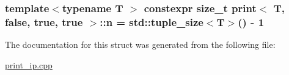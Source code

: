 \subsubsection[{\texorpdfstring{n}{n}}]{\setlength{\rightskip}{0pt plus 5cm}template$<$typename T $>$ constexpr size\+\_\+t {\bf print}$<$ T, false, true, true $>$\+::n = std\+::tuple\+\_\+size$<$T$>$() -\/ 1\hspace{0.3cm}{\ttfamily [static]}}\hypertarget{structprint_3_01T_00_01false_00_01true_00_01true_01_4_a2206343ff3fdd5212f3984384d1d59dc}{}\label{structprint_3_01T_00_01false_00_01true_00_01true_01_4_a2206343ff3fdd5212f3984384d1d59dc}


The documentation for this struct was generated from the following file\+:\begin{DoxyCompactItemize}
\item 
\hyperlink{print__ip_8cpp}{print\+\_\+ip.\+cpp}\end{DoxyCompactItemize}
